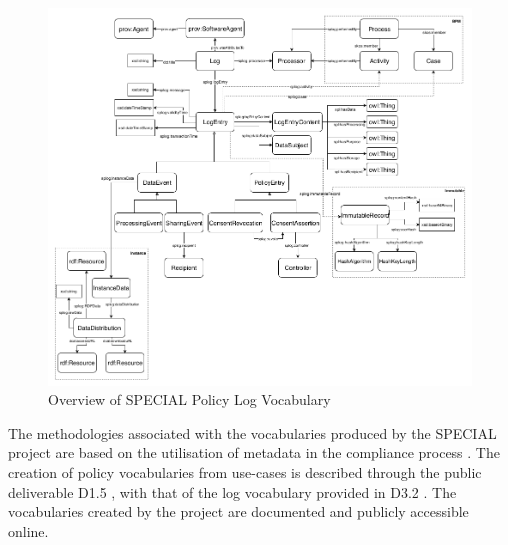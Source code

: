 \begin{figure}[htbp]
    \centering
    \includegraphics[width=\linewidth]{img/SPECIAL_logvocabulary.png}
    \caption{Overview of SPECIAL Policy Log Vocabulary \cite{bonatti_special_2018-1}}
    \label{fig:SPECIAL-policy-log-vocabulary}
\end{figure}

The methodologies associated with the vocabularies produced by the SPECIAL project are based on the utilisation of metadata in the compliance process \cite{wenning_compliance_2018}. The creation of policy vocabularies from use-cases is described through the public deliverable D1.5 \cite{bonatti_d1.5_2018}, with that of the log vocabulary provided in D3.2 \cite{kirrane_d2.7_2018}. The vocabularies created by the project are documented and publicly accessible online.

